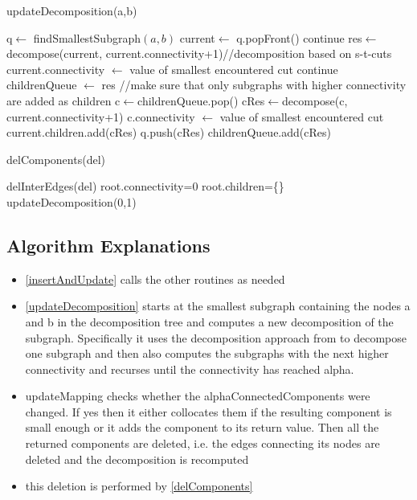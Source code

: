 \documentclass[a4paper,xcolor=dvipsnames, tikz, 12pt]{article}
\theoremstyle{definition}
\begin{document}
\begin{algorithm}
	\caption{updateDecomposition(a,b)}
	\label{updateDecomposition}
	\begin{algorithmic}
		\STATE q$\leftarrow$ findSmallestSubgraph$(a,b)$
		\STATE current$\leftarrow$ q.popFront()
		\STATE continue
		\ENDIF
		\STATE res$\leftarrow$ decompose(current, current.connectivity+1)//decomposition based on s-t-cuts
		\STATE current.connectivity $\leftarrow$ value of smallest encountered cut
		\STATE continue
		\ENDIF
		\STATE childrenQueue $\leftarrow$ res
		\STATE //make sure that only subgraphs with higher connectivity are added as children
		\STATE c$\leftarrow$childrenQueue.pop()
		\STATE cRes$\leftarrow$decompose(c, current.connectivity+1)
		\STATE c.connectivity $\leftarrow$ value of smallest encountered cut
		\STATE current.children.add(cRes)
		\STATE q.push(cRes)
		\ENDIF
		\ELSE
		\STATE childrenQueue.add(cRes)
		\ENDIF
		\ENDWHILE
		\ENDWHILE
	\end{algorithmic}		
\end{algorithm}

\begin{algorithm}
	\caption{delComponents(del)}
	\label{delComponents}
	\begin{algorithmic}
		\STATE delInterEdges(del)
		\STATE root.connectivity=0
		\STATE root.children=\{\}
		\STATE updateDecomposition(0,1)
	\end{algorithmic}
\end{algorithm}


\subsection{Algorithm Explanations}
\begin{itemize}
	\item \cref{insertAndUpdate} calls the other routines as needed
	\item \cref{updateDecomposition} starts at the smallest subgraph containing the nodes a and b in the decomposition tree and computes a new decomposition of the subgraph. Specifically it uses the decomposition approach from \cite{Chang2013} to decompose one subgraph and then also computes the subgraphs with the next higher connectivity and recurses until the connectivity has reached alpha.
	\item updateMapping checks whether the alphaConnectedComponents were changed. If yes then it either collocates them if the resulting component is small enough or it adds the component to its return value. Then all the returned components are deleted, i.e. the edges connecting its nodes are deleted and the decomposition is recomputed
	\item this deletion is performed by \cref{delComponents}
\end{itemize}
\end{document}
